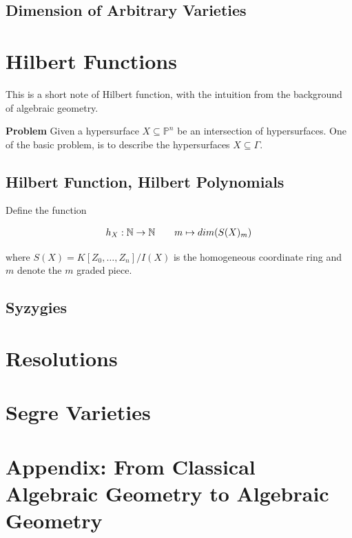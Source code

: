 \documentclass[Total.tex]{subfiles}
\begin{document}
		\section{Dimension of Arbitrary Varieties}
		
	\chapter{Hilbert Functions}
	
		
	
		This is a short note of Hilbert function, with the intuition from the background of algebraic geometry.
		
		\textbf{Problem} Given a hypersurface $X\subseteq \mathbb{P}^n$ be an intersection of hypersurfaces. One of the basic problem, is to describe the hypersurfaces $X\subseteq \Gamma$.
		
		\section{Hilbert Function, Hilbert Polynomials}
		
		\begin{Def}
			Define the function
			
			\begin{gather*}
				h_X:\mathbb{N}\rightarrow \mathbb{N}\qquad m\mapsto dim(S(X)_m)
			\end{gather*}
			
			where $S(X)=K[Z_0,\dots,Z_n]/I(X)$ is the homogeneous coordinate ring and $m$ denote the $m$ graded piece.
		\end{Def}
		
		\section{Syzygies}
			
	\chapter{Resolutions}
	
	\chapter{Segre Varieties}
	
	\chapter{Appendix: From Classical Algebraic Geometry to Algebraic Geometry}
	
\end{document}
